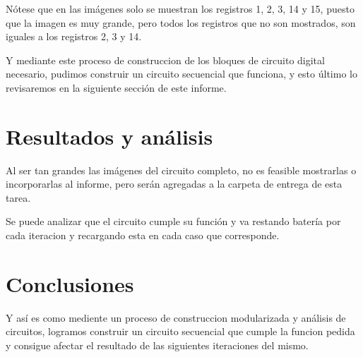 \documentclass[a4paper]{article}
\begin{document}
Nótese que en las imágenes solo se muestran los registros 1, 2, 3, 14 y 15, puesto que la imagen es muy grande, pero todos los registros que no son mostrados, son iguales a los registros 2, 3 y 14.

Y mediante este proceso de construccion de los bloques de circuito digital necesario, pudimos construir un circuito secuencial que funciona, y esto último lo revisaremos en la siguiente sección de este informe.

\section{Resultados y análisis}
Al ser tan grandes las imágenes del circuito completo, no es feasible mostrarlas o incorporarlas al informe, pero serán agregadas a la carpeta de entrega de esta tarea.

Se puede analizar que el circuito cumple su función y va restando batería por cada iteracion y recargando esta en cada caso que corresponde.


\section{Conclusiones}
Y así es como mediente un proceso de construccion modularizada y análisis de circuitos, logramos construir un circuito secuencial que cumple la funcion pedida y consigue afectar el resultado de las siguientes iteraciones del mismo. 
\end{document}
